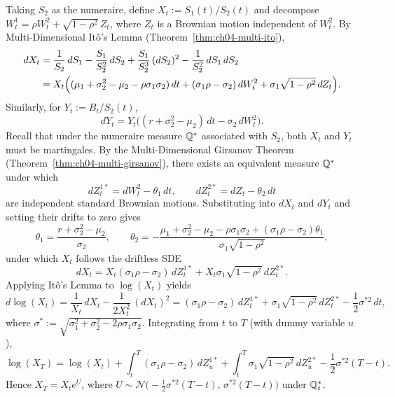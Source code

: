 Taking $S_2$ as the numeraire, define $X_t := S_1(t) / S_2(t)$ and decompose $W_t^1 = \rho W_t^2 + \sqrt{1 - \rho^2}\,Z_t$, where $Z_t$ is a Brownian motion independent of $W_t^2$. By Multi-Dimensional It\^o's Lemma (Theorem~\ref{thm:ch04-multi-ito}),
\begin{align*}
    dX_t
    &= \frac{1}{S_2}\,dS_1 - \frac{S_1}{S_2^2}\,dS_2 + \frac{S_1}{S_2^3}\,(dS_2)^2 - \frac{1}{S_2^2}\,dS_1\,dS_2 \\
    &= X_t\Bigl((\mu_1 + \sigma_2^2 - \mu_2 - \rho\sigma_1\sigma_2)\,dt + (\sigma_1\rho - \sigma_2)\,dW_t^2 + \sigma_1\sqrt{1 - \rho^2}\,dZ_t\Bigr).
\end{align*}
Similarly, for $Y_t := B_t / S_2(t)$,
\[
    dY_t = Y_t\bigl((r + \sigma_2^2 - \mu_2)\,dt - \sigma_2\,dW_t^2\bigr).
\]
Recall that under the numeraire measure $\mathbb{Q}^*$ associated with $S_2$, both $X_t$ and $Y_t$ must be martingales. By the Multi-Dimensional Girsanov Theorem (Theorem~\ref{thm:ch04-multi-girsanov}), there exists an equivalent measure $\mathbb{Q}^*$ under which
\[
    dZ_t^{1*} = dW_t^2 - \theta_1\,dt, \qquad
    dZ_t^{2*} = dZ_t - \theta_2\,dt
\]
are independent standard Brownian motions. Substituting into $dX_t$ and $dY_t$ and setting their drifts to zero gives
\[
    \theta_1 = \frac{r + \sigma_2^2 - \mu_2}{\sigma_2}, \qquad
    \theta_2 = -\frac{\mu_1 + \sigma_2^2 - \mu_2 - \rho\sigma_1\sigma_2 + (\sigma_1\rho - \sigma_2)\theta_1}{\sigma_1\sqrt{1 - \rho^2}},
\]
under which $X_t$ follows the driftless SDE
\[
    dX_t = X_t(\sigma_1\rho - \sigma_2)\,dZ_t^{1*} + X_t\sigma_1\sqrt{1 - \rho^2}\,dZ_t^{2*}.
\]
Applying It\^o's Lemma to $\log(X_t)$ yields
\[
    d\log(X_t) = \frac{1}{X_t}\,dX_t - \frac{1}{2X_t^2}\,(dX_t)^2
    = (\sigma_1\rho - \sigma_2)\,dZ_t^{1*} + \sigma_1\sqrt{1 - \rho^2}\,dZ_t^{2*} - \frac{1}{2}\sigma^{*2}\,dt,
\]
where $\sigma^* := \sqrt{\sigma_1^2 + \sigma_2^2 - 2\rho\sigma_1\sigma_2}$. Integrating from $t$ to $T$ (with dummy variable $u$),
\[
    \log(X_T) = \log(X_t) + \int_t^T (\sigma_1\rho - \sigma_2)\,dZ_u^{1*} + \int_t^T \sigma_1\sqrt{1 - \rho^2}\,dZ_u^{2*} - \frac{1}{2}\sigma^{*2}(T - t).
\]
Hence $X_T = X_t e^U$, where $U \sim \mathcal{N}\bigl(-\frac{1}{2}\sigma^{*2}(T - t),\, \sigma^{*2}(T - t)\bigr)$ under $\mathbb{Q}_t^*$.

